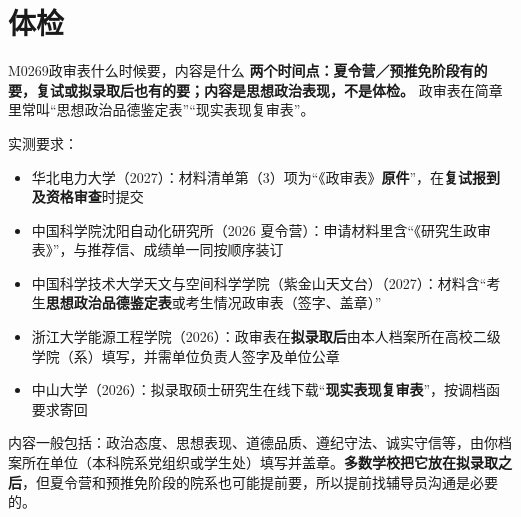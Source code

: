 \section{体检}
\begin{qa}{M0269}{政审表什么时候要，内容是什么}
\textbf{两个时间点：夏令营／预推免阶段有的要，复试或拟录取后也有的要；内容是思想政治表现，不是体检。} 政审表在简章里常叫“思想政治品德鉴定表”“现实表现复审表”。

实测要求：

\begin{itemize}
  \item 华北电力大学（2027）：材料清单第（3）项为“《政审表》\textbf{原件}”，在\textbf{复试报到及资格审查}时提交
  \item 中国科学院沈阳自动化研究所（2026 夏令营）：申请材料里含“《研究生政审表》”，与推荐信、成绩单一同按顺序装订
  \item 中国科学技术大学天文与空间科学学院（紫金山天文台）（2027）：材料含“考生\textbf{思想政治品德鉴定表}或考生情况政审表（签字、盖章）”
  \item 浙江大学能源工程学院（2026）：政审表在\textbf{拟录取后}由本人档案所在高校二级学院（系）填写，并需单位负责人签字及单位公章
  \item 中山大学（2026）：拟录取硕士研究生在线下载“\textbf{现实表现复审表}”，按调档函要求寄回
\end{itemize}

内容一般包括：政治态度、思想表现、道德品质、遵纪守法、诚实守信等，由你档案所在单位（本科院系党组织或学生处）填写并盖章。\textbf{多数学校把它放在拟录取之后}，但夏令营和预推免阶段的院系也可能提前要，所以提前找辅导员沟通是必要的。
\end{qa}

